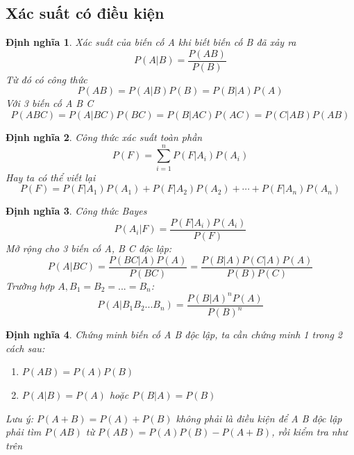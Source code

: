\documentclass[12pt]{article}
\newtheorem{thm}{Định nghĩa}
\begin{document}
\subsection{Xác suất có điều kiện}
\begin{thm}
Xác suất của biến cố A khi biết biến cố B đã xảy ra
\begin{equation}
P(A|B) = \frac{P(AB)}{P(B)}
\end{equation}
Từ đó có công thức
\begin{equation}
P(AB) = P(A|B)P(B) = P(B|A)P(A)
\end{equation}
Với 3 biến cố A B C
\begin{equation}
P(ABC) = P(A|BC)P(BC) = P(B|AC)P(AC) = P(C|AB)P(AB)
\end{equation}
\end{thm}

\begin{thm}
Công thức xác suất toàn phần
\begin{equation}
P(F) = \sum_{i=1}^n P(F|A_i)P(A_i)
\end{equation}
Hay ta có thể viết lại
\begin{equation}
P(F) = P(F|A_1)P(A_1) + P(F|A_2)P(A_2) + \cdots + P(F|A_n)P(A_n)
\end{equation}
\end{thm}

\begin{thm}
Công thức Bayes
\begin{equation}
P(A_i|F) = \frac{P(F|A_i)P(A_i)}{P(F)}
\end{equation}
Mở rộng cho 3 biến cố A, B C độc lập:
\begin{equation}
P(A|BC) = \frac{P(BC|A)P(A)}{P(BC)} = \frac{P(B|A) P(C|A) P(A)}{P(B)P(C)}
\end{equation}
Trường hợp $A, B_1 = B_2 = ... = B_n$:
\begin{equation}
P(A|B_1B_2...B_n) = \frac{P(B|A)^n P(A)}{P(B)^n}
\end{equation}
\end{thm}

\begin{thm}
    Chứng minh biến cố A B độc lập, ta cần chứng minh 1 trong 2 cách sau:
    \begin{enumerate}
        \item $P(AB) = P(A)P(B)$
        \item $P(A|B) = P(A)$ hoặc $P(B|A) = P(B)$
    \end{enumerate}
    Lưu ý: $P(A+B) = P(A) + P(B)$ không phải là điều kiện để A B độc lập \\
    phải tìm $P(AB)$ từ $P(AB) = P(A)P(B) - P(A+B)$, rồi kiểm tra như trên

\end{thm}
\end{document}
